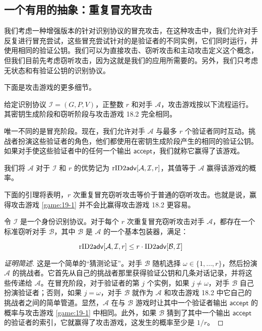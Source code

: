 \subsection{一个有用的抽象：重复冒充攻击}

我们考虑一种增强版本的针对识别协议的冒充攻击，在这种攻击中，我们允许对手反复进行冒充尝试，这些冒充尝试针对的是验证者的不同实例，它们同时运行，并使用相同的验证公钥。我们可以为直接攻击、窃听攻击和主动攻击定义这个概念，但我们目前先考虑窃听攻击，因为这就是我们的应用所需要的。另外，我们只考虑无状态和有验证公钥的识别协议。

下面是攻击游戏的更多细节。

\begin{game}[$r$ 次重复冒充窃听攻击]\label{game:19-1}
给定识别协议 $\mathcal{I}=(G,P,V)$，正整数 $r$ 和对手 $\mathcal{A}$，攻击游戏按以下流程运行。其密钥生成阶段和窃听阶段与攻击游戏 18.2 完全相同。

唯一不同的是冒充阶段。现在，我们允许对手 $\mathcal{A}$ 与最多 $r$ 个验证者同时互动。挑战者扮演这些验证者的角色，他们都使用在密钥生成阶段产生的相同的验证公钥。如果对手使这些验证者中的任何一个输出 $\mathsf{accept}$，我们就称它赢得了该游戏。

我们将 $\mathcal{A}$ 对于 $\mathcal{I}$ 和 $r$ 的优势记为 ${\rm rID2\mathsf{adv}}[\mathcal{A},\mathcal{I},r]$，其值等于 $\mathcal{A}$ 赢得该游戏的概率。
\end{game}

下面的引理将表明，$r$ 次重复冒充窃听攻击等价于普通的窃听攻击。也就是说，赢得攻击游戏 \ref{game:19-1} 并不会比赢得攻击游戏 18.2 更容易。

\begin{lemma}\label{theo:19-6}
令 $\mathcal{I}$ 是一个身份识别协议。对于每个 $r$ 次重复冒充窃听攻击对手 $\mathcal{A}$，都存在一个标准窃听对手 $\mathcal{B}$，其中 $\mathcal{B}$ 是 $\mathcal{A}$ 的一个基本包装器，满足：

\begin{equation}
{\rm rID2\mathsf{adv}}[\mathcal{A},\mathcal{I},r]\leq r\cdot{\rm ID2\mathsf{adv}}[\mathcal{B}, \mathcal{I}]
\end{equation}

\end{lemma}

\begin{proof}[证明简述]
这是一个简单的“猜测论证”。对手 $\mathcal{B}$ 随机选择 $\omega\in\{1,\dots,r\}$，然后扮演 $\mathcal{A}$ 的挑战者。它首先从自己的挑战者那里获得验证公钥和几条对话记录，并将这些传递给 $\mathcal{A}$。在冒充阶段，对于验证者的第 $j$ 个实例，如果 $j\neq\omega$，对手 $\mathcal{B}$ 自己扮演验证者；否则，如果 $j=\omega$，对手 $\mathcal{B}$ 就作为 $\mathcal{A}$ 和攻击游戏 18.2 中它自己的挑战者之间的简单管道。显然，$\mathcal{A}$ 在与 $\mathcal{B}$ 游戏时让其中一个验证者输出 $\mathsf{accept}$ 的概率与攻击游戏 \ref{game:19-1} 中相同。此外，如果 $\mathcal{B}$ 猜到了其中一个输出 $\mathsf{accept}$ 的验证者的索引，它就赢得了攻击游戏，这发生的概率至少是 ${1}/{r}$。
\end{proof}

